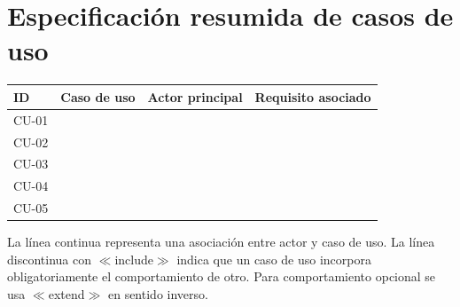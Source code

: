 \documentclass[11pt,a4paper]{article}
\begin{document}
\section*{Especificación resumida de casos de uso}

\begin{center}
\begin{tabularx}{\linewidth}{@{}C{1.7cm} L{3.4cm} L{2.6cm} Y@{}}
\toprule
\sffamily\bfseries\color{lgPrimario}ID &
\sffamily\bfseries\color{lgPrimario}Caso de uso &
\sffamily\bfseries\color{lgPrimario}Actor principal &
\sffamily\bfseries\color{lgPrimario}Requisito asociado \\
\midrule
CU-01 &  &  &  \\
CU-02 &    &  &  \\
CU-03 &        &    &  \\
CU-04 &   &      &  \\
CU-05 &           &              &  \\
\bottomrule
\end{tabularx}
\end{center}

\begin{nota}[Notación]
La línea continua representa una asociación entre actor y caso de uso. La línea
discontinua con $\ll$include$\gg$ indica que un caso de uso incorpora
obligatoriamente el comportamiento de otro. Para comportamiento opcional se usa
$\ll$extend$\gg$ en sentido inverso.
\end{nota}
\end{document}
